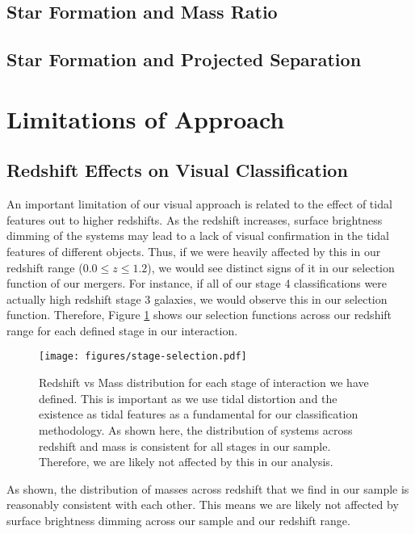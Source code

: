 \documentclass[fleqn,usenatbib]{mnras}
\begin{document}
\subsection{Star Formation and Mass Ratio}

\subsection{Star Formation and Projected Separation}

\section{Limitations of Approach}\label{sec:limitations}
\subsection{Redshift Effects on Visual Classification}
\noindent An important limitation of our visual approach is related to the effect of tidal features out to higher redshifts. As the redshift increases, surface brightness dimming of the systems may lead to a lack of visual confirmation in the tidal features of different objects. Thus, if we were heavily affected by this in our redshift range ($0.0 \leq z \leq 1.2$), we would see distinct signs of it in our selection function of our mergers. For instance, if all of our stage 4 classifications were actually high redshift stage 3 galaxies, we would observe this in our selection function. Therefore, Figure \ref{fig:redshift_selection} shows our selection functions across our redshift range for each defined stage in our interaction.

\begin{figure}
    \centering
    \texttt{[image: figures/stage-selection.pdf]}
    \caption{Redshift vs Mass distribution for each stage of interaction we have defined. This is important as we use tidal distortion and the existence as tidal features as a fundamental for our classification methodology. As shown here, the distribution of systems across redshift and mass is consistent for all stages in our sample. Therefore, we are likely not affected by this in our analysis.}
    \label{fig:redshift_selection}
\end{figure}

As shown, the distribution of masses across redshift that we find in our sample is reasonably consistent with each other. This means we are likely not affected by surface brightness dimming across our sample and our redshift range.
\end{document}
